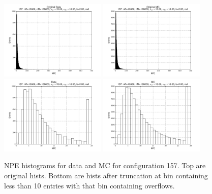 \begin{figure}[htbp] \begin{center} 
\includegraphics[width=0.45\textwidth]{../FIGURES/157/FIG_Original_Data.pdf} 
\includegraphics[width=0.45\textwidth]{../FIGURES/157/FIG_Original_MC.pdf} 
\includegraphics[width=0.45\textwidth]{../FIGURES/157/FIG_Data.pdf} 
\includegraphics[width=0.45\textwidth]{../FIGURES/157/FIG_MC.pdf} 
\caption{NPE histograms for data and MC for configuration 157. Top are original hists. Bottom are hists after truncation at bin containing less than 10 entries with that bin containing overflows.} 
\label{tab:npe_157} 
\end{center} \end{figure} 
\clearpage
 